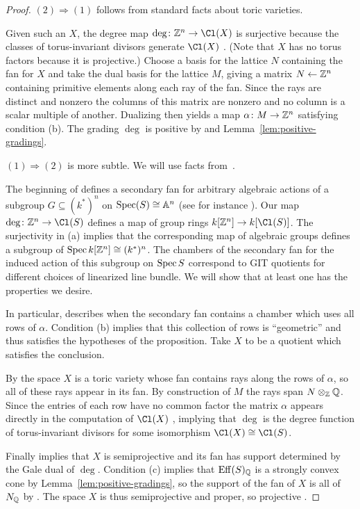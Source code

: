 \documentclass{amsart}
\begin{document}
  \begin{proof}
    $(2)\Rightarrow (1)$ follows from standard facts about toric varieties.

    Given such an $X$, the degree map $\deg\colon\ZZ^n\to\Cl(X)$ is surjective because the classes of torus-invariant divisors generate $\Cl(X)$ \cite[Theorem 4.1.3]{CLS2011}.  (Note that $X$ has no torus factors because it is projective.)  Choose a basis for the lattice $N$ containing the fan for $X$ and take the dual basis for the lattice $M$, giving a matrix $N\gets \mathbb Z^n$ containing primitive elements along each ray of the fan.  Since the rays are distinct and nonzero the columns of this matrix are nonzero and no column is a scalar multiple of another. Dualizing then yields a map $\alpha\colon M\to \mathbb Z^n$ satisfying condition (b).  The grading $\deg$ is positive by \cite[Corollary 1.2(i)]{Cox95} and Lemma~\ref{lem:positive-gradings}.

    $(1)\Rightarrow (2)$ is more subtle.  We will use facts from~\cite[Chapters 14 and 15]{CLS2011}.

    The beginning of \cite[Chapter 14.4]{CLS2011} defines a secondary fan for arbitrary algebraic actions of a subgroup $G\subseteq (k^*)^n$ on $\operatorname{Spec}(S)\cong \mathbb A^n$ (see for instance \cite[Lemmas 14.4.6 and 14.4.7]{CLS2011}).  Our map $\deg\colon\ZZ^n\to\Cl(S)$ defines a map of group rings $k[\ZZ^n]\to k[\Cl(S)]$.  The surjectivity in (a) implies that the corresponding map of algebraic groups defines a subgroup of $\operatorname{Spec} k[\mathbb Z^n]\cong(k^*)^n$.  The chambers of the secondary fan for the induced action of this subgroup on $\operatorname{Spec} S$ correspond to GIT quotients for different choices of linearized line bundle.  We will show that at least one has the properties we desire.

    In particular, \cite[Proposition 15.1.6]{CLS2011} describes when the secondary fan contains a chamber which uses all rows of $\alpha$.  Condition (b) implies that this collection of rows is ``geometric'' and thus satisfies the hypotheses of the proposition.  Take $X$ to be a quotient which satisfies the conclusion.

    By \cite[Theorem 14.2.13]{CLS2011} the space $X$ is a toric variety whose fan contains rays along the rows of $\alpha$, so all of these rays appear in its fan.  By construction of $M$ the rays span $N\otimes_\mathbb Z\mathbb Q$.  Since the entries of each row have no common factor the matrix $\alpha$ appears directly in the computation of $\Cl(X)$ \cite[Theorem 4.1.3]{CLS2011}, implying that $\deg$ is the degree function of torus-invariant divisors for some isomorphism $\Cl(X)\cong\Cl(S)$.

    Finally \cite[Proposition 14.4.1]{CLS2011} implies that $X$ is semiprojective and its fan has support determined by the Gale dual of $\deg$.  Condition (c) implies that $\operatorname{Eff}(S)_\mathbb Q$ is a strongly convex cone by Lemma~\ref{lem:positive-gradings}, so the support of the fan of $X$ is all of $N_\mathbb Q$ by \cite[Proposition 14.3.2]{CLS2011}.  The space $X$ is thus semiprojective and proper, so projective \cite[Propositions 7.0.6 and 7.2.9]{CLS2011}.
  \end{proof}

\ifdefined\whole
\else


\end{document}
